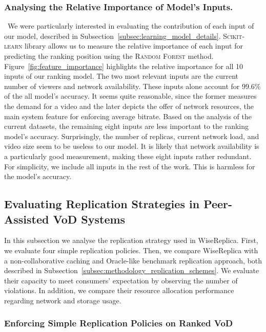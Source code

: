 \subsubsection{Analysing the Relative Importance of Model's Inputs.}

\ We were particularly interested in evaluating the contribution of each input of our model, described in Subsection~\ref{subsec:learning_model_details}. \textsc{Scikit-learn} library allows us to measure the relative importance of each input for predicting the ranking position using the \textsc{Random Forest} method. Figure~\ref{fig:feature_importance} highlights the relative importance for all 10 inputs of our ranking model. The two most relevant inputs are the current number of viewers and network availability. These inputs alone account for 99.6\% of the all model's accuracy. It seems quite reasonable, since the former measures the demand for a video and the later depicts the offer of network resources, the main system feature for enforcing average bitrate. Based on the analysis of the current datasets, the remaining eight inputs are less important to the ranking model's accuracy. Surprisingly, the number of replicas, current network load, and video size seem to be useless to our model. It is likely that network availability is a particularly good measurement, making these eight inputs rather redundant. For simplicity, we include all inputs in the rest of the work. This is harmless for the model's accuracy.

\subsection{Evaluating Replication Strategies in Peer-Assisted VoD Systems}
\label{subsec:performance_evaluation}

In this subsection we analyse the replication strategy used in WiseReplica. First, we evaluate four simple replication policies. Then, we compare WiseReplica with a non-collaborative caching and Oracle-like benchmark replication approach, both described in Subsection~\ref{subsec:methodology_replication_schemes}. We evaluate their capacity to meet consumers' expectation by observing the number of violations. In addition, we compare their resource allocation performance regarding network and storage usage.

\subsubsection{Enforcing Simple Replication Policies on Ranked VoD}

